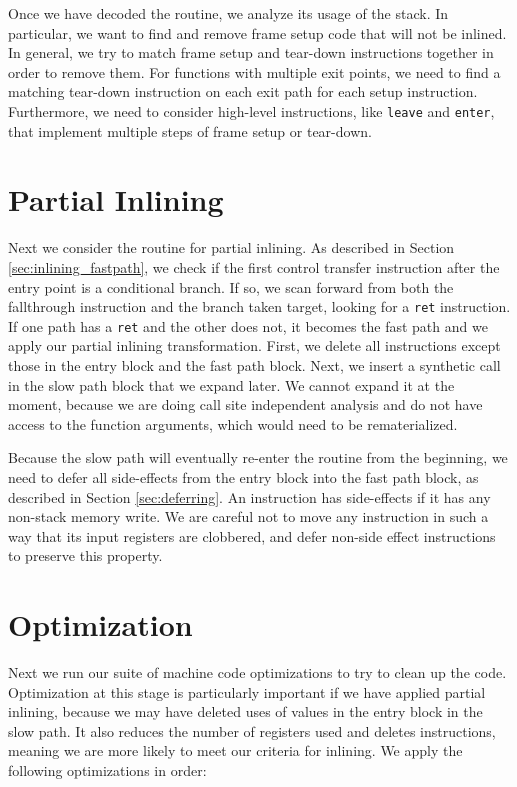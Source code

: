 Once we have decoded the routine, we analyze its usage of the stack.  In
particular, we want to find and remove frame setup code that will not be
inlined.  In general, we try to match frame setup and tear-down instructions
together in order to remove them.  For functions with multiple exit points, we
need to find a matching tear-down instruction on each exit path for each setup
instruction.  Furthermore, we need to consider high-level instructions, like
{\tt leave} and {\tt enter}, that implement multiple steps of frame setup or
tear-down.

\section{Partial Inlining}

Next we consider the routine for partial inlining.  As described in Section
\ref{sec:inlining_fastpath}, we check if the first control transfer instruction
after the entry point is a conditional branch.  If so, we scan forward from both
the fallthrough instruction and the branch taken target, looking for a {\tt ret}
instruction.  If one path has a {\tt ret} and the other does not, it becomes the
fast path and we apply our partial inlining transformation.  First, we delete
all instructions except those in the entry block and the fast path block.  Next,
we insert a synthetic call in the slow path block that we expand later.  We
cannot expand it at the moment, because we are doing call site independent
analysis and do not have access to the function arguments, which would need to
be rematerialized.

Because the slow path will eventually re-enter the routine from the beginning,
we need to defer all side-effects from the entry block into the fast path block,
as described in Section \ref{sec:deferring}.  An instruction has side-effects if
it has any non-stack memory write.  We are careful not to move any instruction
in such a way that its input registers are clobbered, and defer non-side effect
instructions to preserve this property.

\section{Optimization}

Next we run our suite of machine code optimizations to try to clean up the code.
Optimization at this stage is particularly important if we have applied partial
inlining, because we may have deleted uses of values in the entry block in the
slow path.  It also reduces the number of registers used and deletes
instructions, meaning we are more likely to meet our criteria for inlining.  We
apply the following optimizations in order:

